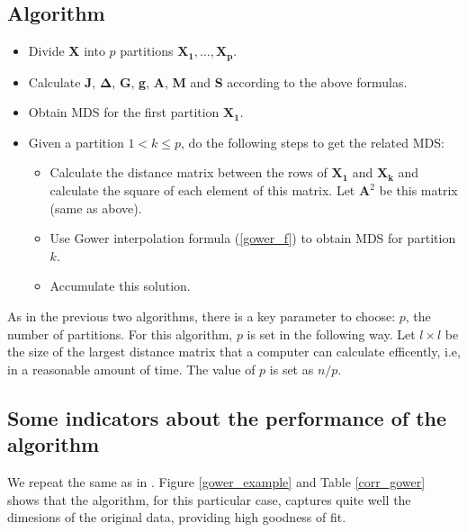 \documentclass[11pt]{report}
\begin{document}
\subsection{Algorithm}

\begin{itemize}
\item Divide \textbf{X} into $p$ partitions $\mathbf{X_1},\dots, \mathbf{X_p}$.

\item Calculate \textbf{J}, $\mathbf{\Delta}$, \textbf{G}, \textbf{g},
\textbf{A}, \textbf{M} and \textbf{S} according to the above formulas.

\item Obtain MDS for the first partition $\mathbf{X_1}$. 

\item Given a partition $1 < k \leq p$, do the following steps to get the 
related MDS:

\begin{itemize}

\item Calculate the distance matrix between the rows of $\mathbf{X_1}$ and
$\mathbf{X_k}$ and calculate the square of each element of this matrix. Let
$\mathbf{A}^2$ be this matrix (same as above).

\item Use Gower interpolation formula (\ref{gower_f}) to obtain MDS for 
partition $k$. 

\item Accumulate this solution.


\end{itemize}

\end{itemize}


As in the previous two algorithms, there is a key parameter to choose: $p$,
the number of partitions. For this algorithm, $p$ is set in the following way.
Let $l \times l$ be the size of the largest distance matrix that a computer can 
calculate efficently, i.e, in a reasonable amount of time. The value of 
$p$ is set as $n/p$.


\subsection{Some indicators about the performance of the algorithm}
We repeat the same as in . Figure \ref{gower_example} 
and Table \ref{corr_gower} shows that the algorithm, for this particular case, 
captures quite well the dimesions of the original data, providing high 
goodness of fit.
\end{document}
